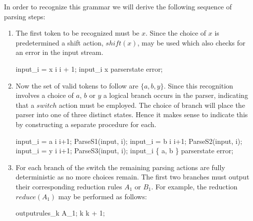 \documentclass[11pt]{article}
\begin{document}
In order to recognize this grammar we will derive the following sequence of parsing steps:
\begin{enumerate}
\item The first token to be recognized must be $x$. Since the choice of $x$ is predetermined a shift action, $shift(x)$, may be used which also checks for an error in the input stream.
\begin{center}
\begin{gcl}
\IF input_i = x \rightarrow i \becomes i + 1;
\BAR input_i \neq x \rightarrow parserstate \becomes error;
\FI
\end{gcl}
\end{center}

\item Now the set of valid tokens to follow are $\{ a, b, y \}$. 
Since this recognition involves a choice of $a$, $b$ or $y$ a logical branch occurs in the parser, indicating that a $switch$ action must be employed.
The choice of branch will place the parser into one of three distinct states. Hence it makes sense to indicate this by constructing a separate procedure for each.
\begin{center}
\begin{gcl}
\IF input_i = a \rightarrow 
                \qquad i \becomes i+1; 
                \qquad ParseS1(input, i);
\BAR input_i = b \rightarrow 
                \qquad i \becomes i+1;
                \qquad ParseS2(input, i);
\BAR input_i = y \rightarrow 
                \qquad i \becomes i+1; 
                \qquad ParseS3(input, i);
\BAR input_i \notin \{ a, b \} \rightarrow 
                \qquad parserstate \becomes error;
\FI
\end{gcl}
\end{center}

\item For each branch of the switch the remaining parsing actions are fully deterministic as no more choices remain.
The first two branches must output their corresponding reduction rules $A_1$ or $B_1$. 
For example, the reduction $reduce(A_1)$ may be performed as follows:
\begin{center}
\begin{gcl}
outputrules_k \becomes A_1;
k \becomes k + 1;
\end{gcl}
\end{center}


\end{enumerate}
\end{document}
